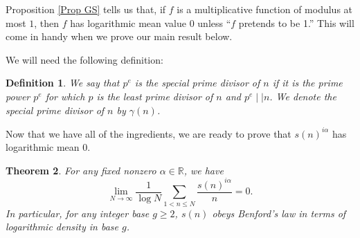 \documentclass[11pt, reqno]{amsart}
\newtheorem{theorem}{Theorem}
\newtheorem{definition}[theorem]{Definition}
\theoremstyle{remark}
\numberwithin{theorem}{section}
\numberwithin{proposition}{section}
\numberwithin{lemma}{section}
\numberwithin{corollary}{section}
\numberwithin{equation}{section}
\numberwithin{conjecture}{section}
\numberwithin{definition}{section}
\newcommand{\R}{\mathbb{R}}
\begin{document}
	
	Proposition \ref{Prop GS} tells us that, if $f$ is a multiplicative function of modulus at most $1$, then $f$ has logarithmic mean value $0$ unless ``$f$ pretends to be 1.'' This will come in handy when we prove our main result below. 
    
    We will need the following definition:

    \begin{definition}\label{def:specialprimedivisor} We say that $p^e$ is the \textit{special prime divisor} of $n$ if it is the prime power $p^e$ for which  $p$ is the least prime divisor of $n$ and $p^e\mid\mid n$. We denote the special prime divisor of $n$ by $\gamma(n)$. \end{definition}

    Now that we have all of the ingredients, we are ready to prove that $s(n)^{i\alpha}$ has logarithmic mean $0$.


    
    
    
\begin{theorem}\label{thm:slogmean} For any fixed nonzero $\alpha\in\R$, we have $$\lim_{N \rightarrow \infty} \frac{1}{\log N} \sum_{1<n \leq N} \frac{s(n)^{i\alpha}}{n} = 0.$$
In particular,   for any integer base $g\geq 2$, $s(n)$ obeys Benford's law in terms of logarithmic density in base $g$.
\end{theorem}
\end{document}
